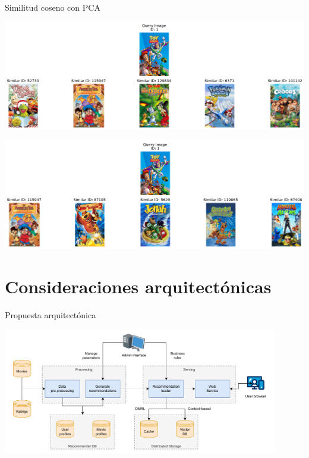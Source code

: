 \documentclass{beamer}
\begin{document}
\begin{frame}{Similitud coseno con PCA}
    \begin{minipage}{0.48\textwidth}
        \includegraphics[width=\textwidth]{images/vgg16_cnn.png}
    \end{minipage}
    \hfill
    \begin{minipage}{0.48\textwidth}
        \includegraphics[width=\textwidth]{images/vgg16_fc2.png}
    \end{minipage}
\end{frame}

\section{Consideraciones arquitectónicas}
\begin{frame}{Propuesta arquitectónica}
    \begin{center}
        \includegraphics[width=0.9\textwidth]{images/tfm-arch.drawio.pdf}
    \end{center}
    \caption{Arquitectura propuesta para despliegue en producción.}
\end{frame}
\end{document}
